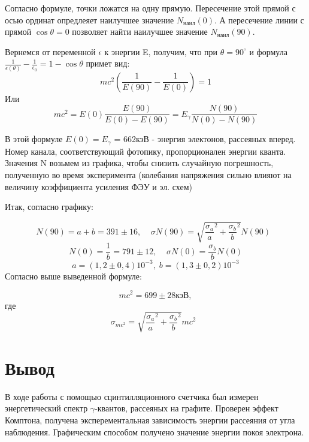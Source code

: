 \documentclass[a4paper]{article}
\begin{document}
\begin{enumerate}
    Согласно формуле, точки ложатся на одну прямую. Пересечение этой прямой с осью 
    ординат опредлеяет наилучшее значение $N_{\text{наил}}(0)$. А пересечение линии с прямой $\cos{\theta} = 0$
    позволяет найти наилучшее значение $N_{\text{наил}}(90)$.

    Вернемся от переменной $\epsilon$ к энергии E, получим, что при $\theta = 90^{\circ}$ и формула 
    $\frac{1}{\epsilon(\theta)} - \frac{1}{\epsilon_0} = 1 - \cos{\theta}$ примет вид:
    $$mc^2 \left( \frac{1}{E(90)} - \frac{1}{E(0)} \right) = 1$$
    Или 
    $$mc^2 = E(0) \frac{E(90)}{E(0) - E(90)} = E_{\gamma} \frac{N(90)}{N(0) - N(90)}$$

    В этой формуле $E(0) = E_{\gamma}$ = 662кэВ - энергия электонов, рассеяных вперед. Номер канала, соответствующий фотопику,
    пропорционален энергии кванта. Значения N возьмем из графика, чтобы снизить случайную погрешность, полученную во время эксперимента
    (колебания напряжения сильно влияют на величину коэффициента усиления ФЭУ и эл. схем)

    Итак, согласно графику:

    $$N(90) = a + b = 391 \pm 16 , \;\;\;\; \sigma N(90) = \sqrt{\frac{\sigma_a}{ a}^2+\frac{\sigma_b}{b}^2}N(90) \;\;$$
    $$ N(0) = \frac{1}{b}= 791 \pm 12 ,\;\;\;\; \sigma N(0) = \frac{\sigma_b}{b} N(0) $$
    $$ a = (1,2 \pm 0,4)10^{-3},\; b = (1,3 \pm 0,2)10^{-3} $$
    Согласно выше выведенной формуле:

    $$mc^2 = 699  \pm 28 \text{кэВ},$$ где $$\sigma_{mc^2} = \sqrt{\frac{\sigma_a}{ a}^2+\frac{\sigma_b}{b}^2}mc^2\;\;$$


\end{enumerate}

\section{Вывод}

В ходе работы с помощью сцинтилляционного счетчика был измерен энергетический спектр $\gamma$-квантов,
рассеяных на графите. Проверен эффект Комптона, получена эксперементальная зависимость энергии рассеяния 
от угла наблюдения. Графическим способом получено значение энергии покоя электрона.
\end{document}
